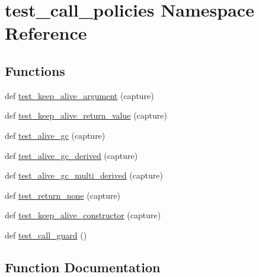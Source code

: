 \hypertarget{namespacetest__call__policies}{}\section{test\+\_\+call\+\_\+policies Namespace Reference}
\label{namespacetest__call__policies}
\subsection*{Functions}
\begin{DoxyCompactItemize}
\item 
def \mbox{\hyperlink{namespacetest__call__policies_a3503a40d639819681abec14cc4fab2f5}{test\+\_\+keep\+\_\+alive\+\_\+argument}} (capture)
\item 
def \mbox{\hyperlink{namespacetest__call__policies_ad9a818ed9df08bdd1abd2e7e1e16dbb6}{test\+\_\+keep\+\_\+alive\+\_\+return\+\_\+value}} (capture)
\item 
def \mbox{\hyperlink{namespacetest__call__policies_abfe17bcd92831a21295d33df833cc1d1}{test\+\_\+alive\+\_\+gc}} (capture)
\item 
def \mbox{\hyperlink{namespacetest__call__policies_a57a04cfb6c94ab28c82c23f4f60a19ce}{test\+\_\+alive\+\_\+gc\+\_\+derived}} (capture)
\item 
def \mbox{\hyperlink{namespacetest__call__policies_a1ef233243dce9b4c6b5885ce04029bd7}{test\+\_\+alive\+\_\+gc\+\_\+multi\+\_\+derived}} (capture)
\item 
def \mbox{\hyperlink{namespacetest__call__policies_a151c39309dd80a86c3a3788e2753cb2d}{test\+\_\+return\+\_\+none}} (capture)
\item 
def \mbox{\hyperlink{namespacetest__call__policies_a780675ccb1ca9e4ed1e7b8a2165d83e4}{test\+\_\+keep\+\_\+alive\+\_\+constructor}} (capture)
\item 
def \mbox{\hyperlink{namespacetest__call__policies_ad5f93d123c7adf224349cf3044f31b73}{test\+\_\+call\+\_\+guard}} ()
\end{DoxyCompactItemize}


\subsection{Function Documentation}
\mbox{\label{namespacetest__call__policies_abfe17bcd92831a21295d33df833cc1d1}} 
